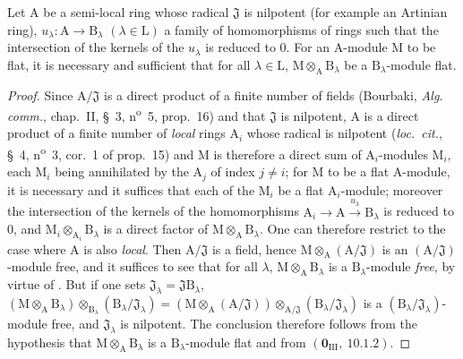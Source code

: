 \begin{corollary}[11.4.3]
\label{IV.11.4.3}
Let $\mathrm{A}$ be a semi-local ring whose radical $\mathfrak{J}$ is nilpotent (for
example an Artinian ring), $u_\lambda:\mathrm{A}\to\mathrm{B}_\lambda$ $(\lambda\in\mathrm{L})$ a family of homomorphisms of rings such
that the intersection of the kernels of the $u_\lambda$ is reduced to $0$. For an $\mathrm{A}$-module $\mathrm{M}$ to be flat, it is necessary and
sufficient that for all $\lambda\in\mathrm{L}$, $\mathrm{M}\otimes_\mathrm{A}\mathrm{B}_\lambda$ be a $\mathrm{B}_\lambda$-module flat.
\end{corollary}

\begin{proof}
Since $\mathrm{A}/\mathfrak{J}$ is a direct product of a finite number of fields (Bourbaki, \emph{Alg. comm.},
chap.~II, \S~3, n\textsuperscript{o}~5, prop.~16) and that $\mathfrak{J}$ is nilpotent, $\mathrm{A}$ is a direct product of a
finite number of \emph{local} rings $\mathrm{A}_i$ whose radical is nilpotent (\emph{loc.\ cit.}, \S~4, n\textsuperscript{o}~3, cor.~1
of prop.~15) and $\mathrm{M}$ is therefore a direct sum of $\mathrm{A}_i$-modules $\mathrm{M}_i$, each $\mathrm{M}_i$ being
annihilated by the $\mathrm{A}_j$ of index $j\neq i$; for $\mathrm{M}$ to be a flat $\mathrm{A}$-module, it is necessary and it
suffices that each of the $\mathrm{M}_i$ be a flat $\mathrm{A}_i$-module; moreover the intersection of the kernels
of the homomorphisms $\mathrm{A}_i\longrightarrow\mathrm{A}\xrightarrow{u_\lambda}\mathrm{B}_\lambda$ is reduced to $0$, and $\mathrm{M}_i\otimes_{\mathrm{A}_i}\mathrm{B}_\lambda$ is a direct factor
of $\mathrm{M}\otimes_\mathrm{A}\mathrm{B}_\lambda$. One can therefore restrict to the case where $\mathrm{A}$ is also \emph{local}. Then $\mathrm{A}/\mathfrak{J}$ is a
field, hence $\mathrm{M}\otimes_\mathrm{A}(\mathrm{A}/\mathfrak{J})$ is an $(\mathrm{A}/\mathfrak{J})$-module free, and it suffices to see that for
all $\lambda$, $\mathrm{M}\otimes_\mathrm{A}\mathrm{B}_\lambda$ is a $\mathrm{B}_\lambda$-module \emph{free}, by virtue of . But if one sets $\mathfrak{J}_\lambda=\mathfrak{J}\mathrm{B}_\lambda$,
$(\mathrm{M}\otimes_\mathrm{A}\mathrm{B}_\lambda)\otimes_{\mathrm{B}_\lambda}(\mathrm{B}_\lambda/\mathfrak{J}_\lambda)=(\mathrm{M}\otimes_\mathrm{A}(\mathrm{A}/\mathfrak{J}))\otimes_{\mathrm{A}/\mathfrak{J}}(\mathrm{B}_\lambda/\mathfrak{J}_\lambda)$ is a $(\mathrm{B}_\lambda/\mathfrak{J}_\lambda)$-module free, and $\mathfrak{J}_\lambda$ is
nilpotent. The conclusion therefore follows from the hypothesis that $\mathrm{M}\otimes_\mathrm{A}\mathrm{B}_\lambda$ is a $\mathrm{B}_\lambda$-module
flat and from $(\mathbf{0}_{\mathrm{III}},~10.1.2)$.
\end{proof}

